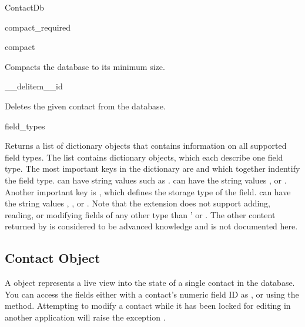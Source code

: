 \begin{classdesc*}{ContactDb}
\begin{methoddesc}[ContactDb]{compact_required}{}
\end{methoddesc}

\begin{methoddesc}[ContactDb]{compact}{}

Compacts the database to its minimum size.

\end{methoddesc}

\begin{methoddesc}[ContactDb]{__delitem__}{id}

Deletes the given contact from the database.

\end{methoddesc}

\begin{methoddesc}[ContactDb]{field_types}{}

Returns a list of dictionary objects that contains information on all 
supported field types. The list contains dictionary objects, which each 
describe one field type. The most important keys in the dictionary are 
 and  which together indentify the field 
type.  can have string values such as 
.  can have the string values 
,  or . Another important key 
is , which defines the storage type of the field. 
 can have the string values , 
,  or . Note that 
the  extension does not support adding, reading, or 
modifying fields of any other type than ' or 
. The other content returned by  
is considered to be advanced knowledge and is not documented here.

\end{methoddesc}

\end{classdesc*}

\subsection{Contact Object}
\label{subsec:contact}

A  object represents a live view into the state of a single 
contact in the database. You can access the fields either with a contact's 
numeric field ID as , or using the  
method. Attempting to modify a contact while it has been locked for editing 
in another application will raise the exception .

